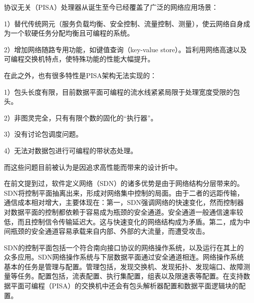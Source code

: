 
协议无关（PISA）处理器从诞生至今已经覆盖了广泛的网络应用场景：

1）替代传统网元（服务负载均衡、安全控制、流量控制、测量），使云网络自身成为一个软硬任务分配均衡且可编程的系统。

2）增加网络随路专用功能，如键值查询（key-value store）。旨利用网络高速以及可编程交换机特点，使特殊功能的性能大幅提升。

在此之外，也有很多特性是PISA架构无法实现的：

1）包头长度有限，目前数据平面可编程的流水线紧紧局限于处理宽度受限的包头。

2）非图灵完全，只有有限个数的固化的“执行器”。

3）没有讨论包调度问题。

4）无法对数据包进行可编程的带状态处理。

而这些问题目前被认为是因追求高性能而带来的设计折中。









在前文提到过，软件定义网络（SDN）的诸多优势是由于网络结构分层带来的。SDN将控制平面抽离出来，形成对网络集中控制的局面。由于二者的远距传输，通信成本相对增大，主要体现在：第一，SDN强调网络的快速变化，然而控制器对数据平面的控制都依赖于容易成为瓶颈的安全通道。安全通道一般通信速率较低，而且控制信令传输延迟大。这与快速变化的网络结构成为矛盾。第二，成为中间瓶颈的安全通道容易承载来自内部、外部的大流量，而遭受攻击。

SDN的控制平面包括一个符合南向接口协议的网络操作系统，以及运行在其上的众多应用。SDN网络操作系统与下层数据平面通过安全通道相连。网络操作系统基本的任务是管理与配置。管理包括，发现交换机、发现拓扑、发现端口、故障测量等任务。配置包括，流表配置、执行集配置，组表以及限速表等配置。在支持数据平面可编程（PISA）的交换机中还会有包头解析器配置和数据平面逻辑块的配置。


